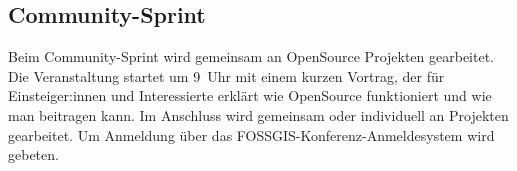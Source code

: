 \subsection*{Community-Sprint}
Beim Community-Sprint wird gemeinsam an OpenSource Projekten gearbeitet.
Die Veranstaltung startet um 9~Uhr mit einem kurzen Vortrag, der für Einsteiger:innen
und Interessierte erklärt wie OpenSource funktioniert und wie man beitragen kann.
Im Anschluss wird gemeinsam oder individuell an Projekten gearbeitet.
Um Anmeldung über das FOSSGIS-Konferenz-Anmeldesystem wird gebeten.

